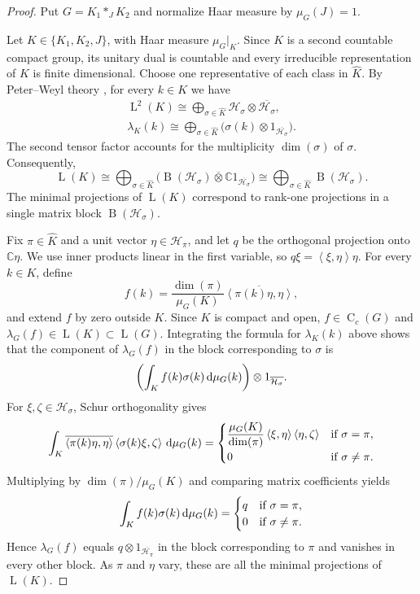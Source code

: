 \documentclass[11pt]{amsart}
\numberwithin{equation}{section}
\newcommand{\cc}{\mathbb C}
\renewcommand{\H}{\mathcal H}
\newcommand{\pt}{\otimes}
\newcommand{\ovt}{\mathbin{\overline{\otimes}}}
\DeclareMathOperator{\LL}{L}
\newcommand{\ps}[2]{\left\langle #1,#2\right\rangle}
\newcommand{\ovl}[1]{\overline{#1}}
\newcommand{\rB}{\operatorname{B}}
\newcommand{\rC}{\operatorname{C}}
\newcommand{\rL}{\operatorname{L}}
\theoremstyle{definition}
\begin{document}
\begin{proof}
    Put $G=K_1\ast_JK_2$ and normalize Haar measure by $\mu_G(J)=1$.

    Let $K\in\{K_1,K_2,J\}$, with Haar measure $\mu_G|_K$. Since $K$ is a second countable compact group, its unitary dual is countable and every irreducible representation of $K$ is finite dimensional. Choose one representative of each class in $\widehat K$. By Peter--Weyl theory \cite[Theorem~5.12]{Fo16}, for every $k\in K$ we have
    $$
        \begin{gathered}
            \rL^2(K)\cong\bigoplus_{\sigma\in\widehat K}
            \H_\sigma\pt\ovl{\H_\sigma},\\
            \lambda_K(k)\cong\bigoplus_{\sigma\in\widehat K}
            \bigl(\sigma(k)\pt1_{\ovl{\H_\sigma}}\bigr).
        \end{gathered}
    $$
    The second tensor factor accounts for the multiplicity $\dim(\sigma)$ of $\sigma$. Consequently,
    $$
        \LL(K)\cong\bigoplus_{\sigma\in\widehat K}
        \bigl(\rB(\H_\sigma)\ovt\cc1_{\ovl{\H_\sigma}}\bigr)
        \cong\bigoplus_{\sigma\in\widehat K}\rB(\H_\sigma).
    $$
    The minimal projections of $\LL(K)$ correspond to rank-one projections in a single matrix block $\rB(\H_\sigma)$.

    Fix $\pi\in\widehat K$ and a unit vector $\eta\in\H_\pi$, and let $q$ be the orthogonal projection onto $\cc\eta$. We use inner products linear in the first variable, so $q\xi=\ps{\xi}{\eta}\eta$. For every $k\in K$, define
    $$
        f(k)=\frac{\dim(\pi)}{\mu_G(K)}\ovl{\ps{\pi(k)\eta}{\eta}},
    $$
    and extend $f$ by zero outside $K$. Since $K$ is compact and open, $f\in\rC_c(G)$ and $\lambda_G(f)\in\LL(K)\subset\LL(G)$. Integrating the formula for $\lambda_K(k)$ above shows that the component of $\lambda_G(f)$ in the block corresponding to $\sigma$ is
    $$
        \left(\int_K f(k)\sigma(k)\,{\rm d}\mu_G(k)\right)
        \pt1_{\ovl{\H_\sigma}}.
    $$
    For $\xi,\zeta\in\H_\sigma$, Schur orthogonality \cite[Theorem~5.8]{Fo16} gives
    $$
        \int_K\ovl{\ps{\pi(k)\eta}{\eta}}\ps{\sigma(k)\xi}{\zeta}\,{\rm d}\mu_G(k)
        =\begin{cases}
            \dfrac{\mu_G(K)}{\dim(\pi)}\ps{\xi}{\eta}\ps{\eta}{\zeta} & \text{if }\sigma=\pi,\\[6pt]
            0 & \text{if }\sigma\ne\pi.
        \end{cases}
    $$
    Multiplying by $\dim(\pi)/\mu_G(K)$ and comparing matrix coefficients yields
    $$
        \int_K f(k)\sigma(k)\,{\rm d}\mu_G(k)
        =\begin{cases}
            q & \text{if }\sigma=\pi,\\
            0 & \text{if }\sigma\ne\pi.
        \end{cases}
    $$
    Hence $\lambda_G(f)$ equals $q\pt1_{\ovl{\H_\pi}}$ in the block corresponding to $\pi$ and vanishes in every other block. As $\pi$ and $\eta$ vary, these are all the minimal projections of $\LL(K)$.


\end{proof}
\end{document}
